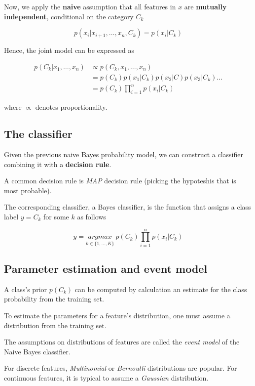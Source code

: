 \documentclass[12pt, a4paper]{article}
\begin{document}
Now, we apply the \textbf{naive} assumption that all features in $x$ are \textbf{mutually independent}, conditional on the category $C_k$

\[
  p(x_i | x_{i+1}, \dots , x_n , C_k) = p(x_i | C_k)
\]

Hence, the joint model can be expressed as

\begin{align*}
  p(C_k | x_1, \dots , x_n) &\propto  p (C_k, x_1, \dots , x_n) \\
                            &= p(C_k)p(x_1|C_k)p(x_2|C)p(x_3|C_k) \dots \\
                            &= p(C_k)\prod_{i=1}^{n}p(x_i|C_k)
\end{align*}

where $\propto$ denotes proportionality.

\subsection{The classifier} \label{the-classifier}

Given the previous naive Bayes probability model, we can construct a classifier combining it with a \textbf{decision rule}.

A common decision rule is \textit{MAP} decision rule (picking the hypoteshis that is most probable).

The corresponding classifier, a Bayes classifier, is the function that assigns a class label $y = C_k$ for some $k$ as follows

\[
  y = \underset{k \in \{ 1, \dots, K\}}{argmax} \ p(C_k) \prod_{i=1}^{n} p(x_i|C_k)
\]

\subsection{Parameter estimation and event model}  \label{parameter-estimation}

A class's prior $p(C_k)$ can be computed by calculation an estimate for the class probability from the training set.

To estimate the parameters for a feature's distribution, one must assume a distribution from the training set.

The assumptions on distributions of features are called the \textit{event model} of the Naive Bayes classifier.

For discrete features, \textit{Multinomial} or \textit{Bernoulli} distributions are popular. For continuous features, it is typical to assume a \textit{Gaussian} distribution.
\end{document}
